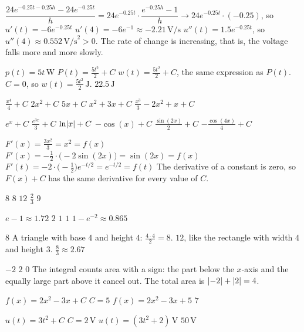 
\begin{facit}

  $\dfrac{24e^{-0.25t - 0.25h} - 24e^{-0.25t}}{h}
= 24e^{-0.25t} \cdot \dfrac{e^{-0.25h} - 1}{h} \to 24e^{-0.25t} \cdot (-0.25)$, so
$u'(t) = -6e^{-0.25t}$
 $u'(4) = -6e^{-1} \approx -2.21\,\text{V/s}$
 $u''(t) = 1.5e^{-0.25t}$, so $u''(4) \approx 0.552\,\text{V/s}^2 > 0$. The rate of change
is increasing, that is, the voltage falls more and more slowly.

  $p(t) = 5t\,\text{W}$  $P(t) = \frac{5t^2}{2} + C$
 $w(t) = \frac{5t^2}{2} + C$, the same expression as $P(t)$.
 $C = 0$, so $w(t) = \frac{5t^2}{2}\,\text{J}$.
 $22.5\,\text{J}$

  $\frac{x^4}{4} + C$  $2x^2 + C$  $5x + C$  $x^2 + 3x + C$
 $\frac{x^3}{3} - 2x^2 + x + C$

  $e^x + C$  $\frac{e^{3x}}{3} + C$  $\ln\lvert x\rvert + C$
 $-\cos(x) + C$  $\frac{\sin(2x)}{2} + C$  $-\frac{\cos(4x)}{4} + C$

  $F'(x) = \frac{3x^2}{3} = x^2 = f(x)$
 $F'(x) = -\frac{1}{2} \cdot \bigl(-2\sin(2x)\bigr) = \sin(2x) = f(x)$
 $F'(t) = -2 \cdot \bigl(-\frac{1}{2}\bigr)e^{-t/2} = e^{-t/2} = f(t)$
 The derivative of a constant is zero, so $F(x) + C$ has the same derivative for every value
of $C$.

  $8$  $8$  $12$  $\frac{2}{3}$  $9$

  $e - 1 \approx 1.72$  $2$  $1$  $1$
 $1 - e^{-2} \approx 0.865$

  $8$  A triangle with base $4$ and height $4$: $\frac{4 \cdot 4}{2} = 8$.
 $12$, like the rectangle with width $4$ and height $3$.  $\frac{8}{3} \approx 2.67$

  $-2$  $2$  $0$
 The integral counts area with a sign: the part below the $x$-axis and the equally large part
above it cancel out. The total area is $\lvert-2\rvert + \lvert2\rvert = 4$.

  $f(x) = 2x^2 - 3x + C$  $C = 5$  $f(x) = 2x^2 - 3x + 5$  $7$

  $u(t) = 3t^2 + C$  $C = 2\,\text{V}$  $u(t) = (3t^2 + 2)\,\text{V}$
 $50\,\text{V}$


\end{facit}
